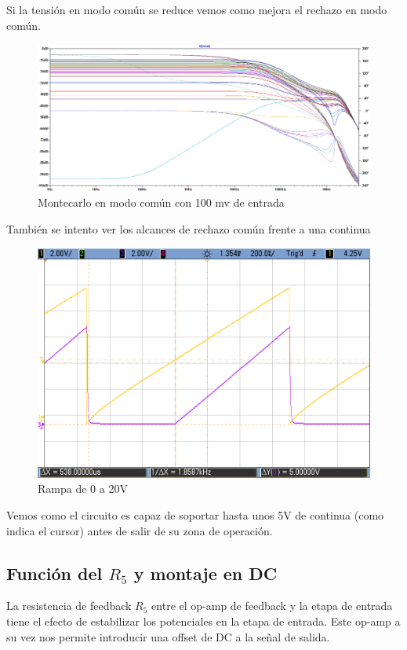 Si la tensión en modo común se reduce vemos como mejora el rechazo en modo común.
\begin{figure}[H]
	\centering
	\includegraphics[height=0.3\textheight]{./ImagenesDeSimulaciones/MonteCarloModoComunGrande100mv.png}
	\caption{Montecarlo en modo común con 100 mv de entrada}
\end{figure} 

También se intento ver los alcances de rechazo común frente a una continua
\begin{figure}[H]
	\centering
	\includegraphics[height=0.3\textheight]{./ImagenesDeOsciloscopio/ModoComunContinua.png}
	\caption{Rampa de 0 a 20V}
\end{figure} 

Vemos como el circuito es capaz de soportar hasta unos 5V de continua (como indica el cursor) antes de salir de su zona de operación.

\subsection{Función del $R_5$ y montaje en DC}
La resistencia de feedback $R_5$ entre el op-amp de feedback y la etapa de entrada tiene el efecto de estabilizar los potenciales en la etapa de entrada. Este op-amp a su vez nos permite introducir una offset de DC a la señal de salida.

